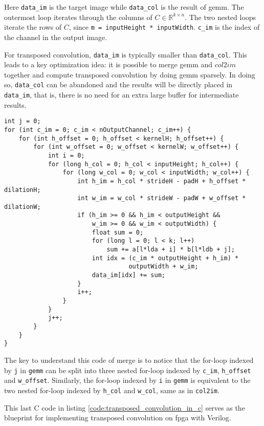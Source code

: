 Here \texttt{data_im} is the target image while \texttt{data_col} is the result of \gls{gemm}.
The outermost loop iterates through the columns of $C \in \mathbb{R}^{k \times n}$. The two nested loops
iterate the rows of $C$, since \texttt{m = inputHeight * inputWidth}. \texttt{c_im} is the
index of the channel in the output image. %

For transposed convolution, \texttt{data_im} is typically smaller than
\texttt{data_col}. This leads to a key optimization idea: it is possible to merge \gls{gemm} and
$col2im$ together and compute transposed convolution by doing \gls{gemm} sparsely. In doing so,
\texttt{data_col} can be abandoned and the results will be directly placed in \texttt{data_im},
that is, there is no need for an extra large buffer for intermediate results.

\begin{code}
\begin{verbatim}
int j = 0;
for (int c_im = 0; c_im < nOutputChannel; c_im++) {
    for (int h_offset = 0; h_offset < kernelH; h_offset++) {
        for (int w_offset = 0; w_offset < kernelW; w_offset++) {
            int i = 0;
            for (long h_col = 0; h_col < inputHeight; h_col++) {
                for (long w_col = 0; w_col < inputWidth; w_col++) {
                    int h_im = h_col * strideH - padH + h_offset * dilationH;
                    int w_im = w_col * strideW - padW + w_offset * dilationW;
                    if (h_im >= 0 && h_im < outputHeight &&
                        w_im >= 0 && w_im < outputWidth) {
                        float sum = 0;
                        for (long l = 0; l < k; l++)
                            sum += a[l*lda + i] * b[l*ldb + j];
                        int idx = (c_im * outputHeight + h_im) *
                                  outputWidth + w_im;
                        data_im[idx] += sum;
                    }
                    i++;
                }
            }
            j++;
        }
    }
}
\end{verbatim}
\label{code:transposed_convolution_in_c}
\end{code}

The key to understand this code of merge is to notice that the for-loop indexed by \texttt{j} in
\texttt{gemm} can be split into three nested for-loop indexed by \texttt{c_im},
\texttt{h_offset} and \texttt{w_offset}.
Similarly, the for-loop indexed by \texttt{i} in \texttt{gemm} is equivalent to the two
nested for-loop indexed by \texttt{h_col} and \texttt{w_col}, same as in \texttt{col2im}.

This last C code in listing \ref{code:transposed_convolution_in_c} serves as the blueprint for implementing
transposed convolution on \gls{fpga} with Verilog.

\clearpage %
